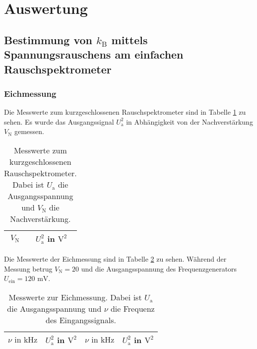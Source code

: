 

\section{Auswertung}

\subsection{Bestimmung von $k_\text{B}$ mittels Spannungsrauschens am 
			einfachen Rauschspektrometer}
		
	
	\subsubsection{Eichmessung}
	
		Die Messwerte zum kurzgeschlossenen Rauschspektrometer sind 
		in Tabelle \ref{tab:eichung_eigenrauschen_einfach} zu sehen. 
		Es wurde das Ausgangssignal $U^2_\text{a}$ in Abhängigkeit von 
		der Nachverstärkung $V_\text{N}$ gemessen.
		
		\begin{table}[h]
		\centering
			\begin{tabular}{cc}
				\toprule \midrule
				$V_\text{N}$ & $U^2_\text{a}$ in $\text{V}^2$
				\\
				\midrule
				
				\midrule \bottomrule
			\end{tabular}
			\caption{Messwerte zum kurzgeschlossenen 
			Rauschspektrometer. Dabei ist $U_\text{a}$ die 
			Ausgangsspannung und $V_\text{N}$ die Nachverstärkung.}
			\label{tab:eichung_eigenrauschen_einfach}
		\end{table}
		
		Die Messwerte der Eichmessung sind in Tabelle 
		\ref{tab:eichung_einfach} zu sehen. Während der Messung 
		betrug $V_\text{N}=20$ und die Ausgangsspannung des 
		Frequenzgenerators $U_\text{ein} = 120 \text{ mV}$.
		
		\begin{table}[h]
		\centering
			\begin{tabular}{cccc}
				\toprule \midrule
				$\nu \text{ in} \text{ kHz}$ & $U^2_\text{a}$ in $\text{V}^2$ &$\nu \text{ in} \text{ 
				kHz}$ & $U^2_\text{a}$ in $\text{V}^2$
				\\
				\midrule
				
				\midrule \bottomrule
			\end{tabular}
			\caption{Messwerte zur Eichmessung. Dabei ist $U_\text{a}$ 
			die 
			Ausgangsspannung und $\nu$ die Frequenz des 
			Eingangssignals. }
			\label{tab:eichung_einfach}
		\end{table}
		
